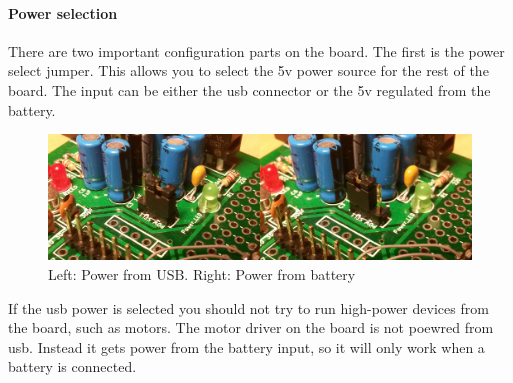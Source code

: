 \documentclass{article}
\begin{document}
\paragraph{Power selection}
There are two important configuration parts on the board. The first is the power select jumper. This allows you to select the 5v power source for the rest of the board. The input can be either the usb connector or the 5v regulated from the battery.
\begin{figure}[h!]
	\centering
    \includegraphics[scale=0.25]{power_jumper.jpg}
    \caption{Left: Power from USB. Right: Power from battery}
\end{figure}

If the usb power is selected you should not try to run high-power devices from the board, such as motors. The motor driver on the board is not poewred from usb. Instead it gets power from the battery input, so it will only work when a battery is connected.
\end{document}
